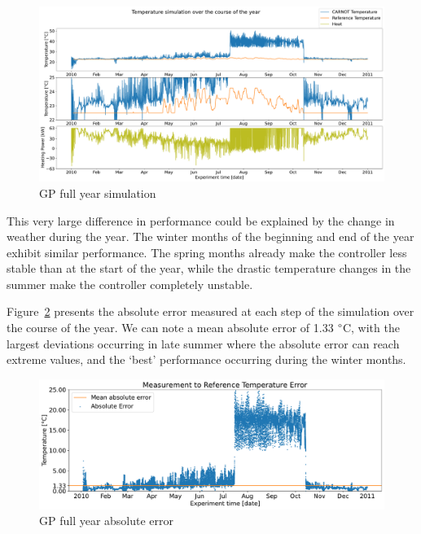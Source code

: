 \begin{figure}[ht]
    \centering
    \includegraphics[width =
    \textwidth]{Plots/4_GP_480pts_12_averageYear_fullyear.pdf}
    \caption{GP full year simulation}
    \label{fig:GP_fullyear_simulation}
\end{figure}

This very large difference in performance could be explained by the change in
weather during the year. The winter months of the beginning and end of the year
exhibit similar performance. The spring months already make the controller less
stable than at the start of the year, while the drastic temperature changes in
the summer make the controller completely unstable.

Figure~\ref{fig:GP_fullyear_abserr} presents the absolute error measured at each
step of the simulation over the course of the year. We can note a mean absolute
error of 1.33 $\degree$C, with the largest deviations occurring in late summer
where the absolute error can reach extreme values, and the `best' performance
occurring during the winter months. 

\begin{figure}[ht]
    \centering
    \includegraphics[width =
    \textwidth]{Plots/4_GP_480pts_12_averageYear_abserr.pdf}
    \caption{GP full year absolute error}
    \label{fig:GP_fullyear_abserr}
\end{figure}

